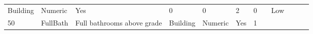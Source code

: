 \documentclass[11pt]{article}
\begin{document}
\begin{longtable}[]{@{}llllllllllll@{}}
\begin{minipage}[t]{0.04\columnwidth}
Building\strut
\end{minipage} & \begin{minipage}[t]{0.04\columnwidth}\raggedright\strut
Numeric\strut
\end{minipage} & \begin{minipage}[t]{0.04\columnwidth}\raggedright\strut
Yes\strut
\end{minipage} & \begin{minipage}[t]{0.04\columnwidth}\raggedright\strut
0\strut
\end{minipage} & \begin{minipage}[t]{0.04\columnwidth}\raggedright\strut
0\strut
\end{minipage} & \begin{minipage}[t]{0.04\columnwidth}\raggedright\strut
2\strut
\end{minipage} & \begin{minipage}[t]{0.04\columnwidth}\raggedright\strut
0\strut
\end{minipage} & \begin{minipage}[t]{0.04\columnwidth}\raggedright\strut
\strut
\end{minipage} & \begin{minipage}[t]{0.04\columnwidth}\raggedright\strut
Low\strut
\end{minipage}\tabularnewline
\begin{minipage}[t]{0.04\columnwidth}\raggedright\strut
50\strut
\end{minipage} & \begin{minipage}[t]{0.04\columnwidth}\raggedright\strut
FullBath\strut
\end{minipage} & \begin{minipage}[t]{0.04\columnwidth}\raggedright\strut
Full bathrooms above grade\strut
\end{minipage} & \begin{minipage}[t]{0.04\columnwidth}\raggedright\strut
Building\strut
\end{minipage} & \begin{minipage}[t]{0.04\columnwidth}\raggedright\strut
Numeric\strut
\end{minipage} & \begin{minipage}[t]{0.04\columnwidth}\raggedright\strut
Yes\strut
\end{minipage} & \begin{minipage}[t]{0.04\columnwidth}\raggedright\strut
1\strut
\end{minipage} & \begin{minipage}[t]{0.04\columnwidth}\raggedright\strut

\end{minipage}
\end{longtable}
\end{document}
